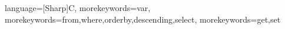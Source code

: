  {
    language=[Sharp]C,
    morekeywords={var},
    morekeywords={from,where,orderby,descending,select}, %
    morekeywords={get,set}
}

\newcommand{\CSharp}[3]{
    \kodeprintstyle{#1}{#2}{#3}{CSharp}
}